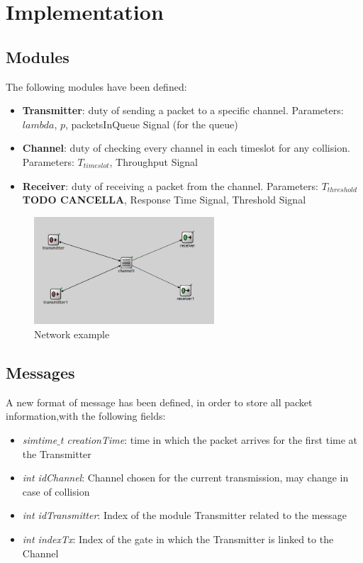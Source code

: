 \section{Implementation}
\subsection{Modules}
The following modules have been defined:
\begin{itemize}
	\item \textbf{Transmitter}: duty of sending a packet to a specific channel. Parameters: $lambda$, $p$, packetsInQueue Signal (for the queue)
	\item \textbf{Channel}: duty of checking every channel in each timeslot for any collision. Parameters: $T_{timeslot}$, Throughput Signal
	\item \textbf{Receiver}: duty of receiving a packet from the channel. Parameters: $T_{threshold}$ \textbf{TODO CANCELLA}, Response Time Signal, Threshold Signal
\end{itemize}

\begin{figure}[H]
	\centering
	\includegraphics[width=0.6\textwidth]{img/network.png}
	\caption{Network example}
	\label {img: network}
\end{figure}

\subsection{Messages}
A new format of message has been defined, in order to store all packet information,with the following fields:
\begin{itemize}
	\item \textit{simtime$\_$t creationTime}: time in which the packet arrives for the first time at the Transmitter
	\item \textit{int idChannel}: Channel chosen for the current transmission, may change in case of collision
	\item \textit{int idTransmitter}: Index of the module Transmitter related to the message
	\item \textit{int indexTx}: Index of the gate in which the Transmitter is linked to the Channel
\end{itemize}

